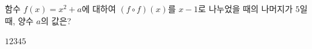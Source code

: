함수 $f(x)=x^2+a$에 대하여 $(f\circ f)(x)$를 $x-1$로 나누었을 때의 나머지가 $5$일 때, 양수 $a$의 값은?
\begin{choices32}{$1$}{$2$}{$3$}{$4$}{$5$}\end{choices32}
